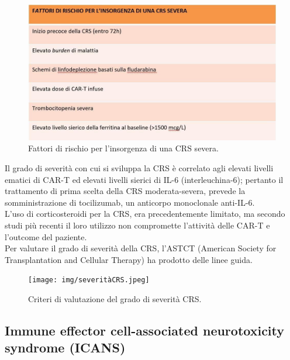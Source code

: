 \begin{figure}[H]
    \begin{center}
    \includegraphics[width=0.7\columnwidth]{img/rischioCRS.jpeg}
    \end{center}
    \caption{Fattori di rischio per l’insorgenza di una CRS severa. 
    \cite{EMATOCART}}
    \label{fig:FIGURE_3.11}
\end{figure}

Il grado di severità con cui si sviluppa la CRS è correlato agli elevati livelli ematici di CAR-T ed elevati livelli 
sierici di IL-6 (interleuchina-6); pertanto il trattamento di prima scelta della CRS moderata-severa, 
prevede la somministrazione di tocilizumab, un anticorpo monoclonale anti-IL-6\cite{EMATOCART}.\\
L’uso di corticosteroidi per la CRS, era precedentemente limitato, ma secondo studi più recenti il loro utilizzo 
non compromette l'attività delle CAR-T e l’outcome del paziente\cite{Cortico}.\\
Per valutare il grado di severità della CRS, l’ASTCT (American Society for Transplantation and Cellular Therapy) 
ha prodotto delle linee guida\cite{ASTCT}.\\

\begin{figure}[H]
    \begin{center}
    \texttt{[image: img/severitàCRS.jpeg]}
    \end{center}
    \caption{Criteri di valutazione del grado di severità CRS.
    \cite{EMATOCART}}

\end{figure}

\subsection{Immune effector cell-associated neurotoxicity syndrome (ICANS)}

